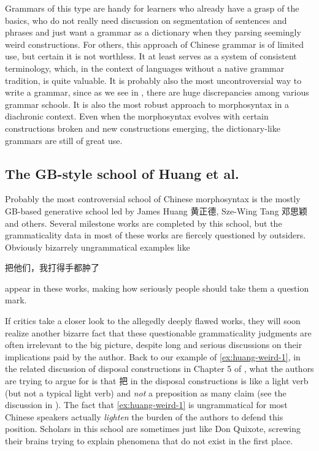 Grammars of this type are handy for learners who already have a grasp of the basics, who do not really need 
discussion on segmentation of sentences and phrases and just want a grammar as a dictionary when they 
parsing seemingly weird constructions. For others, this approach of Chinese grammar is of limited use,
but certain it is not worthless. It at least serves as a system of consistent terminology, which, in 
the context of languages without a native grammar tradition, is quite valuable. It is probably also 
the most uncontroversial way to write a grammar, since as we see in ,
there are huge discrepancies among various grammar schools. It is also the most robust approach to 
morphosyntax in a diachronic context. Even when the morphosyntax evolves with certain constructions broken 
and new constructions emerging, the dictionary-like grammars are still of great use. 

\subsection{The GB-style school of Huang et al.}\label{sec:gb-grammar}

Probably the most controversial school of Chinese morphosyntax is the mostly GB-based generative school led by James Huang 黄正德, 
Sze-Wing Tang 邓思颖 and others. Several milestone works are completed by this school, but the grammaticality 
data in most of these works are fiercely questioned by outsiders. Obviously bizarrely ungrammatical examples 
like \citep[, (65)]{huang2013} 
\begin{exe}
    \ex\label{ex:huang-weird-1} 把他们，我打得手都肿了
\end{exe}
appear in these works, making how seriously people should take them a question mark.

If critics take a closer look to the allegedly deeply flawed works, 
they will soon realize another bizarre fact that 
these questionable grammaticality judgments are often irrelevant to the big picture, 
despite long and serious discussions on their implications paid by the author.
Back to our example of \eqref{ex:huang-weird-1}, 
in the related discussion of disposal constructions in Chapter 5 of \citet{huang2013}, 
what the authors are trying to argue for is that 把 in the disposal constructions 
is like a light verb (but not a typical light verb) and \emph{not} a preposition as many claim 
(see the discussion in ). 
The fact that \eqref{ex:huang-weird-1} is ungrammatical for most Chinese speakers 
actually \emph{lighten} the burden of the authors to defend this position.
Scholars in this school are sometimes just like Don Quixote, 
screwing their brains trying to explain phenomena that do not exist in the first place.

